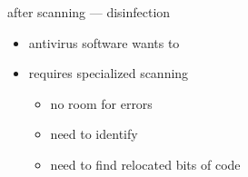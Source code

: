 
\begin{frame}{after scanning --- disinfection}
    \begin{itemize}
    \item antivirus software wants to 
    \item requires specialized scanning
        \begin{itemize}
        \item no room for errors
        \item need to identify 
        \item need to find relocated bits of code
        \end{itemize}
    \end{itemize}
\end{frame}

